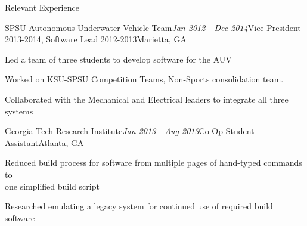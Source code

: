 \begin{rSection}{Relevant Experience}

\begin{rSubsection}{SPSU Autonomous Underwater Vehicle Team}{\em Jan 2012 - Dec 2014}{Vice-President 2013-2014, Software Lead 2012-2013}{Marietta, GA}
\item Led a team of three students to develop software for the AUV
\item Worked on KSU-SPSU Competition Teams, Non-Sports consolidation team.
\item Collaborated with the Mechanical and Electrical leaders to integrate all three systems
\end{rSubsection}

\begin{rSubsection}{Georgia Tech Research Institute}{\em Jan 2013 - Aug 2013}{Co-Op Student Assistant}{Atlanta, GA}
\item Reduced build process for software from multiple pages of hand-typed commands to \\
one simplified build script
\item Researched emulating a legacy system for continued use of required build software
\end{rSubsection}

\end{rSection}